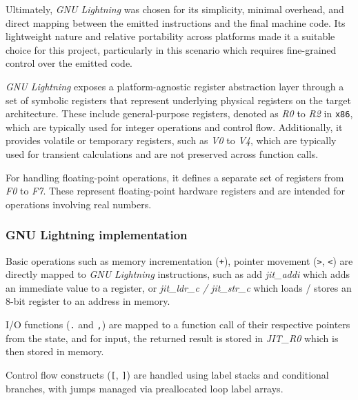\par Ultimately, \textit{GNU Lightning} was chosen for its simplicity, minimal overhead, and direct mapping between the emitted instructions and the final machine code. Its lightweight nature and relative portability across platforms made it a suitable choice for this project, particularly in this scenario which requires fine-grained control over the emitted code.

\par \textit{GNU Lightning} exposes a platform-agnostic register abstraction layer through a set of symbolic registers that represent underlying physical registers on the target architecture. These include general-purpose registers, denoted as \textit{R0} to \textit{R2} in \texttt{x86}, which are typically used for integer operations and control flow. Additionally, it provides volatile or temporary registers, such as \textit{V0} to \textit{V4}, which are typically used for transient calculations and are not preserved across function calls.

\par For handling floating-point operations, it defines a separate set of registers from \textit{F0} to \textit{F7}. These represent floating-point hardware registers and are intended for operations involving real numbers.

\subsubsection{GNU Lightning implementation}
\label{sec:ch2sec2sub2sec2}

\par Basic operations such as memory incrementation (\texttt{+}), pointer movement (\texttt{>}, \texttt{<}) are directly mapped to \textit{GNU Lightning} instructions, such as add \textit{jit\_addi} which adds an immediate value to a register, or \textit{jit\_ldr\_c / jit\_str\_c} which loads / stores an 8-bit register to an address in memory.

\par I/O functions (\texttt{.} and \texttt{,}) are mapped to a function call of their respective pointers from the state, and for input, the returned result is stored in \textit{JIT\_R0} which is then stored in memory.

\par Control flow constructs (\texttt{[}, \texttt{]}) are handled using label stacks and conditional branches, with jumps managed via preallocated loop label arrays.

